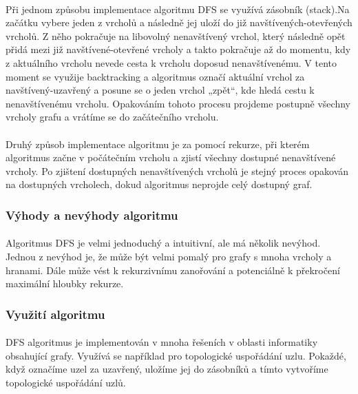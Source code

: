 \documentclass[12pt, titlepage, a4paper]{article}
\begin{document}
\paragraph{}
Při jednom způsobu implementace algoritmu DFS se využívá zásobník (stack).Na začátku vybere jeden z vrcholů a 
následně jej uloží do již navštívených-otevřených vrcholů. Z něho pokračuje na libovolný nenavštívený vrchol, 
který následně opět přidá mezi již navštívené-otevřené vrcholy a takto pokračuje až do momentu, kdy 
z aktuálního vrcholu nevede cesta k vrcholu doposud nenavštívenému. V tento moment se využije 
backtracking a algoritmus označí aktuální vrchol za navštívený-uzavřený a posune se o jeden vrchol 
„zpět“, kde hledá cestu k nenavštívenému vrcholu. Opakováním tohoto procesu projdeme postupně 
všechny vrcholy grafu a vrátíme se do začátečního vrcholu.

\paragraph{}
Druhý způsob implementace algoritmu je za pomocí rekurze, při kterém algoritmus začne v 
počátečním vrcholu a zjistí všechny dostupné nenavštívené vrcholy. Po zjištení dostupných 
nenavštívených vrcholů je stejný proces opakován na dostupných vrcholech, dokud algoritmus 
neprojde celý dostupný graf.
\cite{GeeksforGeeks: DFS,Khan Academy: DFS}

\subsubsection{Výhody a nevýhody algoritmu}
\paragraph{}
Algoritmus DFS je velmi jednoduchý a intuitivní, ale má několik nevýhod. Jednou z 
nevýhod je, že může být velmi pomalý pro grafy s mnoha vrcholy a hranami. Dále může 
vést k rekurzivnímu zanořování a potenciálně k překročení maximální hloubky rekurze.

\subsubsection{Využití algoritmu}
\paragraph{}
DFS algoritmus je implementován v mnoha řešeních v oblasti informatiky obsahující grafy. 
Využívá se například pro topologické uspořádání uzlu. Pokaždé, když označíme uzel za uzavřený, 
uložíme jej do zásobníků a tímto vytvoříme topologické uspořádání uzlů.
\end{document}
